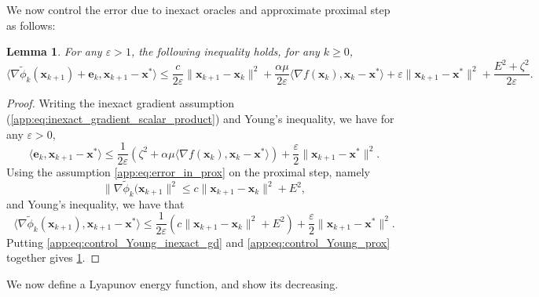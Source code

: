 \documentclass{article}
\def\eps{{\varepsilon}}
\def\ve{{\bm{e}}}
\def\vx{{\bm{x}}}
\theoremstyle{plain}
\newtheorem{lemma}[theorem]{Lemma}
\theoremstyle{definition}
\theoremstyle{remark}
\begin{document}
We now control the error due to inexact oracles and approximate proximal step as follows:
\begin{lemma}
    \label{app:lemma:proof_proxyprox_2}
    For any $\eps >1$, the following inequality holds, for any $k\ge 0$,
    \[
    \langle \nabla \tilde \phi_k(\vx_{k+1}) + \ve_k, \vx_{k+1} - \vx^*\rangle \le \frac{c}{2\eps}\|\vx_{k+1} - \vx_k\|^2  + \frac{\alpha \mu }{2\eps} \langle\nabla f(\vx_k), \vx_k - \vx^* \rangle+ \eps\|\vx_{k+1}-\vx^*\|^2 + \frac{E^2 + \zeta^2}{2\eps}.
    \]
\end{lemma}


\begin{proof}
    Writing the inexact gradient assumption (\cref{app:eq:inexact_gradient_scalar_product}) and Young's inequality, we have for any $\eps >0$,
    \begin{equation}
    \label{app:eq:control_Young_inexact_gd}
        \langle \ve_k, \vx_{k+1} - \vx^*\rangle \le \frac{1}{2\eps}\left(\zeta^2 + \alpha \mu  \langle\nabla f(\vx_k), \vx_k - \vx^* \rangle\right) + \frac{\eps}{2}\|\vx_{k+1}-\vx^*\|^2.
    \end{equation}
    Using the assumption \cref{app:eq:error_in_prox} on the proximal step, namely
    \[
    \|\nabla \tilde \phi_k(\vx_{k+1}\|^2 \le c \|\vx_{k+1} - \vx_k\|^2 + E^2,
    \]
    and Young's inequality, we have that 
    \begin{equation}
    \label{app:eq:control_Young_prox}
        \langle \nabla \tilde \phi_k(\vx_{k+1}), \vx_{k+1} - \vx^*\rangle \le \frac{1}{2\eps}\left(c\|\vx_{k+1} - \vx_k\|^2 + E^2\right) + \frac{\eps}{2}\|\vx_{k+1}-\vx^*\|^2.
    \end{equation}
    Putting \cref{app:eq:control_Young_inexact_gd} and \cref{app:eq:control_Young_prox} together gives \cref{app:lemma:proof_proxyprox_2}.
\end{proof}

We now define a Lyapunov energy function, and show its decreasing.
\end{document}
